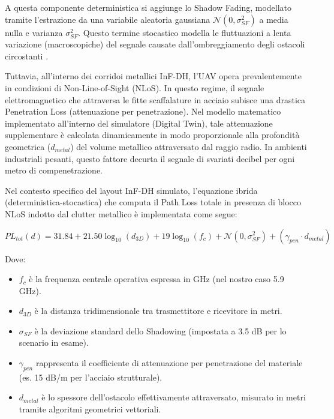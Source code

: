 \documentclass[twoside]{article}
\begin{document}
A questa componente deterministica si aggiunge lo Shadow Fading, modellato tramite l'estrazione da una variabile aleatoria gaussiana $\mathcal{N}(0, \sigma_{SF}^2)$ a media nulla e varianza $\sigma_{SF}^2$. Questo termine stocastico modella le fluttuazioni a lenta variazione (macroscopiche) del segnale causate dall'ombreggiamento degli ostacoli circostanti \cite{Poddar2024}.

Tuttavia, all'interno dei corridoi metallici InF-DH, l'UAV opera prevalentemente in condizioni di Non-Line-of-Sight (NLoS). In questo regime, il segnale elettromagnetico che attraversa le fitte scaffalature in acciaio subisce una drastica Penetration Loss (attenuazione per penetrazione). Nel modello matematico implementato all'interno del simulatore (Digital Twin), tale attenuazione supplementare è calcolata dinamicamente in modo proporzionale alla profondità geometrica ($d_{metal}$) del volume metallico attraversato dal raggio radio. In ambienti industriali pesanti, questo fattore decurta il segnale di svariati decibel per ogni metro di compenetrazione.

Nel contesto specifico del layout InF-DH simulato, l'equazione ibrida (deterministica-stocastica) che computa il Path Loss totale in presenza di blocco NLoS indotto dal clutter metallico è implementata come segue:

\begin{equation} 
PL_{tot}(d) = 31.84 + 21.50 \log_{10}(d_{3D}) + 19 \log_{10}(f_c) + \mathcal{N}(0, \sigma_{SF}^2) + (\gamma_{pen} \cdot d_{metal}) \label{eq:pl_nlos_metal} 
\end{equation}

\clearpage
Dove:
\begin{itemize}
    \item $f_c$ è la frequenza centrale operativa espressa in GHz (nel nostro caso 5.9 GHz).
    \item $d_{3D}$ è la distanza tridimensionale tra trasmettitore e ricevitore in metri.
    \item $\sigma_{SF}$ è la deviazione standard dello Shadowing (impostata a 3.5 dB per lo scenario in esame).
    \item $\gamma_{pen}$ rappresenta il coefficiente di attenuazione per penetrazione del materiale (es. 15 dB/m per l'acciaio strutturale).
    \item $d_{metal}$ è lo spessore dell'ostacolo effettivamente attraversato, misurato in metri tramite algoritmi geometrici vettoriali.
\end{itemize}
\end{document}

